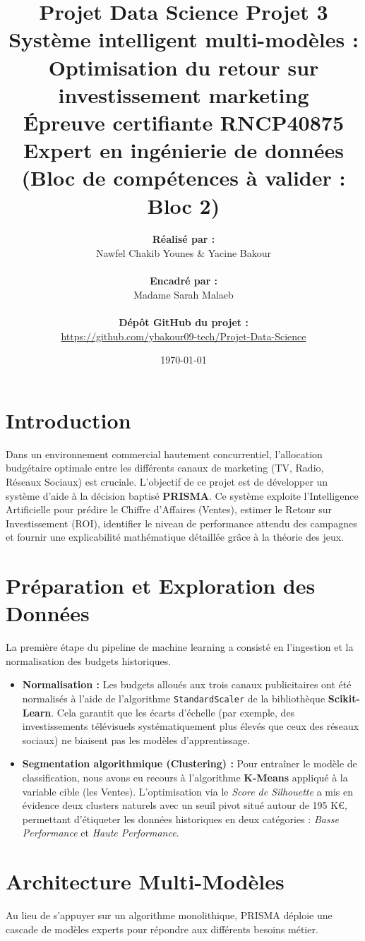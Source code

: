 \documentclass[a4paper,12pt]{article}
\title{
    \vspace{-2cm}
    \textbf{Projet Data Science Projet 3} \\
    \Large Système intelligent multi-modèles : Optimisation du retour sur investissement marketing \\
    \vspace{0.5cm}
    \large Épreuve certifiante RNCP40875 Expert en ingénierie de données (Bloc de compétences à valider : Bloc 2)
}
\author{
    \textbf{Réalisé par :} \\
    Nawfel Chakib Younes \quad \& \quad Yacine Bakour \\
    \vspace{0.5cm} \\
    \textbf{Encadré par :} \\
    Madame Sarah Malaeb \\
    \vspace{0.5cm} \\
    \textbf{Dépôt GitHub du projet :} \\
    \url{https://github.com/ybakour09-tech/Projet-Data-Science}
}
\date{\today}
\begin{document}
\maketitle
\newpage

\tableofcontents
\newpage

\section{Introduction}
Dans un environnement commercial hautement concurrentiel, l'allocation budgétaire optimale entre les différents canaux de marketing (TV, Radio, Réseaux Sociaux) est cruciale. L'objectif de ce projet est de développer un système d'aide à la décision baptisé \textbf{PRISMA}. Ce système exploite l'Intelligence Artificielle pour prédire le Chiffre d'Affaires (Ventes), estimer le Retour sur Investissement (ROI), identifier le niveau de performance attendu des campagnes et fournir une explicabilité mathématique détaillée grâce à la théorie des jeux.

\section{Préparation et Exploration des Données}
La première étape du pipeline de machine learning a consisté en l'ingestion et la normalisation des budgets historiques.
\begin{itemize}
    \item \textbf{Normalisation :} Les budgets alloués aux trois canaux publicitaires ont été normalisés à l'aide de l'algorithme \texttt{StandardScaler} de la bibliothèque \textbf{Scikit-Learn}. Cela garantit que les écarts d'échelle (par exemple, des investissements télévisuels systématiquement plus élevés que ceux des réseaux sociaux) ne biaisent pas les modèles d'apprentissage.
    \item \textbf{Segmentation algorithmique (Clustering) :} Pour entraîner le modèle de classification, nous avons eu recours à l'algorithme \textbf{K-Means} appliqué à la variable cible (les Ventes). L'optimisation via le \textit{Score de Silhouette} a mis en évidence deux clusters naturels avec un seuil pivot situé autour de 195 K€, permettant d'étiqueter les données historiques en deux catégories : \textit{Basse Performance} et \textit{Haute Performance}.
\end{itemize}

\section{Architecture Multi-Modèles}
Au lieu de s'appuyer sur un algorithme monolithique, PRISMA déploie une cascade de modèles experts pour répondre aux différents besoins métier.
\end{document}
